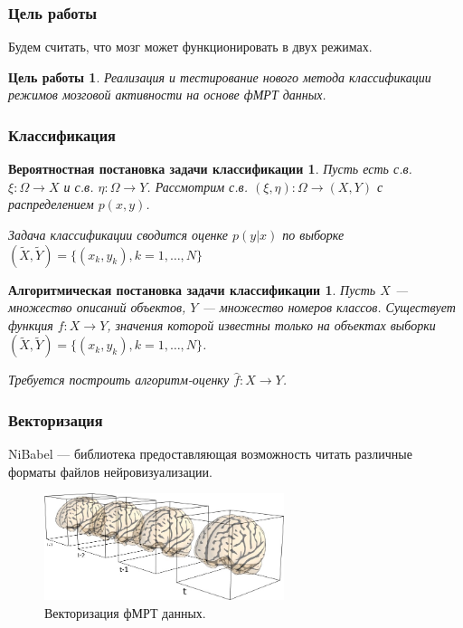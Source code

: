 \documentclass{beamer}
\newtheorem{target_}{Цель работы}
\newtheorem{prob_task}{Вероятностная постановка задачи классификации}
\newtheorem{algo_task}{Алгоритмическая постановка задачи классификации}
\begin{document}
	\begin{frame} 
		\frametitle{Цель работы}
		Будем считать, что мозг может функционировать в двух режимах.
		
		\begin{target_}
			Реализация и тестирование нового метода классификации режимов мозговой активности на основе фМРТ данных.
		\end{target_}			
	\end{frame}

	\begin{frame} 
		\frametitle{Классификация}
		\begin{prob_task}
			Пусть есть с.в. $\xi: \Omega \rightarrow X$ и с.в. $\eta: \Omega \rightarrow Y$. Рассмотрим с.в. $(\xi, \eta): \Omega \rightarrow (X, Y)$ с распределением $p(x, y)$.
			\vspace{0.5cm}
			
			Задача классификации сводится оценке $p(y|x)$ по выборке $(\widetilde{X}, \widetilde{Y}) = \{(x_{k}, y_{k}), k = 1, \dots, N\}$
		\end{prob_task}
	
		\begin{algo_task}
			Пусть $X$ --- множество описаний объектов, $Y$ --- множество номеров классов. Существует функция $f: X \rightarrow Y$, значения которой известны только на объектах выборки $(\widetilde{X}, \widetilde{Y}) =  \{(x_{k}, y_{k}), k = 1, \dots, N\}$. 
			\vspace{0.5cm}
			
			Требуется построить алгоритм-оценку $\widehat{f}: X \rightarrow Y$.
		\end{algo_task}
	\end{frame}

	\begin{frame} 	
		\frametitle{Векторизация}	
		
		NiBabel --- библиотека предоставляющая возможность читать различные форматы файлов нейровизуализации.
		\vspace{0.5cm}
				
		\begin{figure}
			\includegraphics[width=7cm]{../images/vectorization_1.png}
			\caption{Векторизация фМРТ данных.} 
			\label{fg:5}
		\end{figure}
	\end{frame}
	
\end{document}
